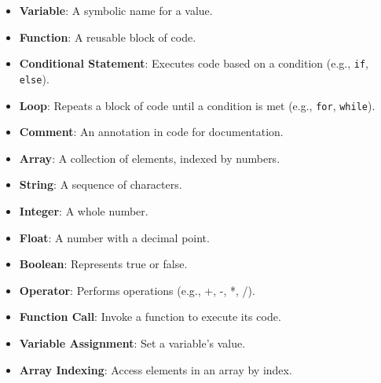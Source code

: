 \documentclass[9pt]{cheatsheet}
\begin{document}
\begin{multicols*}{3}

\begin{itemize}
  \item \textbf{Variable}: A symbolic name for a value.
  \item \textbf{Function}: A reusable block of code.
  \item \textbf{Conditional Statement}: Executes code based on a condition (e.g., \texttt{if}, \texttt{else}).
  \item \textbf{Loop}: Repeats a block of code until a condition is met (e.g., \texttt{for}, \texttt{while}).
  \item \textbf{Comment}: An annotation in code for documentation.
  \item \textbf{Array}: A collection of elements, indexed by numbers.
  \item \textbf{String}: A sequence of characters.
  \item \textbf{Integer}: A whole number.
  \item \textbf{Float}: A number with a decimal point.
  \item \textbf{Boolean}: Represents true or false.
  \item \textbf{Operator}: Performs operations (e.g., +, -, *, /).
  \item \textbf{Function Call}: Invoke a function to execute its code.
  \item \textbf{Variable Assignment}: Set a variable's value.
  \item \textbf{Array Indexing}: Access elements in an array by index.
\end{itemize}

\vfill


\end{multicols*}
\end{document}
